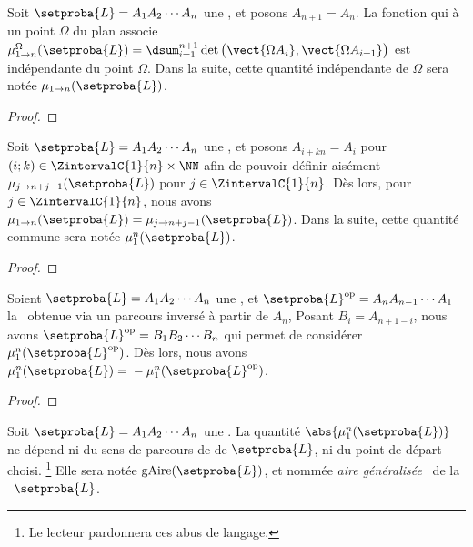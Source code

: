 	


\begin{fact}
	Soit $\setproba{L} = A_1 A_2 \cdots A_n$ une \nline, et posons $A_{n+1} = A_n$.
	La fonction qui à un point $\Omega$ du plan associe 
	$\mu_{1 \to n}^\Omega (\setproba{L}) = \dsum_{i=1}^{n+1} \det \big( \vect{\Omega A_i} , \vect{\Omega A_{i+1}} \big)$ est indépendante du point $\Omega$.
	Dans la suite, cette quantité indépendante de $\Omega$ sera notée $\mu_{1 \to n} (\setproba{L})$.
\end{fact}


\begin{proof}
\end{proof}
	
	


\begin{fact} \label{nline-shift-inva}
	Soit $\setproba{L} = A_1 A_2 \cdots A_n$ une \nline, et posons $A_{i + kn} = A_i$ pour $(i;k) \in \ZintervalC{1}{n} \times \NN$ afin de pouvoir définir aisément $\mu_{j \to n+j-1} (\setproba{L})$ pour $j \in \ZintervalC{1}{n}$.
	Dès lors, pour $j \in \ZintervalC{1}{n}$, nous avons
	$\mu_{1 \to n} (\setproba{L}) = \mu_{j \to n+j-1} (\setproba{L})$.
	Dans la suite, cette quantité commune sera notée $\mu_1^n (\setproba{L})$.
\end{fact}


\begin{proof}
\end{proof}
	
	


\begin{fact} \label{nline-rota-inva}
	Soient 
	$\setproba{L} = A_1 A_2 \cdots A_n$ une \nline, et 
	$\setproba{L}^{\mathrm{op}} = A_n A_{n-1} \cdots A_1$ la \nline\ obtenue via un parcours inversé à partir de $A_n$, 
	Posant $B_i = A_{n + 1 - i}$, nous avons $\setproba{L}^{\mathrm{op}} = B_1 B_2 \cdots B_n$ qui permet de considérer $\mu_1^n (\setproba{L}^{\mathrm{op}})$.
	Dès lors, nous avons
	$\mu_1^n (\setproba{L}) = {} - \mu_1^n (\setproba{L}^{\mathrm{op}})$.
\end{fact}


\begin{proof}
\end{proof}
	
	


\begin{fact}
	Soit 
	$\setproba{L} = A_1 A_2 \cdots A_n$ une \nline.
	La quantité $\abs{\mu_1^n (\setproba{L})}$ ne dépend ni du sens de parcours de de $\setproba{L}$, ni du point de départ choisi.%
	\footnote{
		Le lecteur pardonnera ces abus de langage.
	}
	Elle sera notée $\garea{\setproba{L}}$, et nommée \og \emph{aire généralisée} \fg\ de la \nline\ $\setproba{L}$.
\end{fact}


